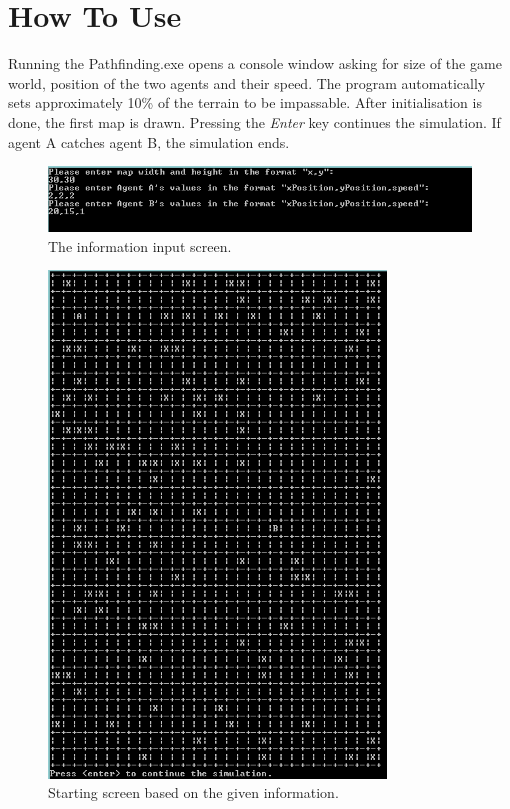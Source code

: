 \section{How To Use}
Running the Pathfinding.exe opens a console window asking for size of the game world, position of the two agents and their speed. The program automatically sets approximately 10\% of the terrain to be impassable. After initialisation is done, the first map is drawn. Pressing the \textit{Enter} key continues the simulation. If agent A catches agent B, the simulation ends.

\begin{figure}[h!]
  \centering
    \includegraphics[width=1\textwidth]{Screenshots/StartingScreen}
  \caption{The information input screen.}
\end{figure}

\begin{figure}[h!]
  \centering
    \includegraphics[width=0.8\textwidth]{Screenshots/Map}
  \caption{Starting screen based on the given information.}
\end{figure}
\clearpage